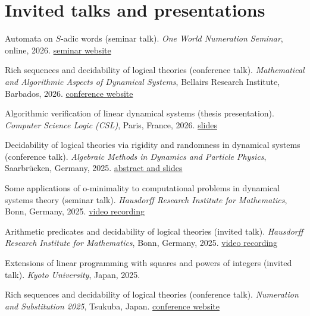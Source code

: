 \documentclass{article}
\begin{document}
	\section*{Invited talks and presentations}
	\begin{etaremune}
		
		\item Automata on $S$-adic words (seminar talk). \emph{One World Numeration Seminar}, online, 2026.
		\href{https://www.irif.fr/~numeration/OWNS}{seminar website}
		
		\item Rich sequences and decidability of logical theories (conference talk). \emph{Mathematical and Algorithmic Aspects of Dynamical Systems}, Bellairs Research Institute, Barbados, 2026. 
		\href{https://dynamics.mpi-sws.org/news/events/maads2026.html#schedule}{conference website}
		
		\item
		Algorithmic verification of linear dynamical systems (thesis presentation).
		\emph{Computer Science Logic (CSL)}, Paris, France, 2026. \href{https://toghrul-karimov.github.io/assets/presentations/csl2026.pdf}{slides}
		
		\item
		Decidability of logical theories via rigidity and randomness in dynamical systems (conference talk). 
		\emph{Algebraic Methods in Dynamics and Particle Physics}, Saarbr\"ucken, Germany, 2025. \href{https://dynaverse2025.mpi-sws.org/decidability-of-logical-theories-via-rigidity-and-randomness-in-dynamical-systems/}{abstract and slides}
		
		\item Some applications of o-minimality to computational problems in dynamical systems theory (seminar talk). \emph{Hausdorff Research Institute for Mathematics}, Bonn, Germany, 2025. 
		\href{https://www.youtube.com/watch?v=xwqYA9wns4g}{video recording}
		
		\item Arithmetic predicates and decidability of logical theories (invited talk).
		\emph{Hausdorff Research Institute for Mathematics}, Bonn, Germany, 2025.
		\href{https://www.youtube.com/watch?v=SYknkHCvM68}{video recording}
		
		\item Extensions of linear programming with squares and powers of integers (invited talk). \emph{Kyoto University}, Japan, 2025.
		
		\item Rich sequences and decidability of logical theories
		 (conference talk). 
		\emph{Numeration and Substitution 2025}, Tsukuba, Japan. \href{https://numeration2025.sciencesconf.org/}{conference website}
		

\end{etaremune}
\end{document}
